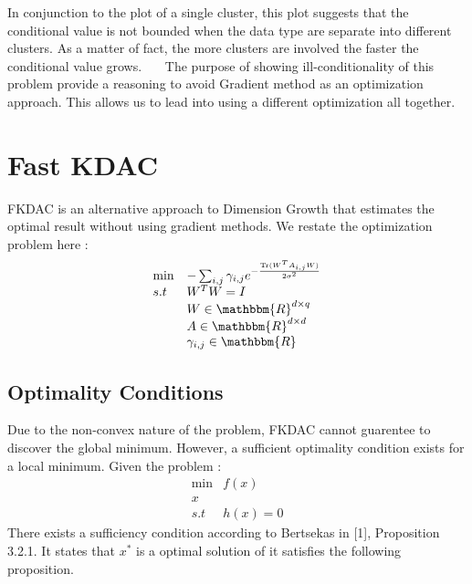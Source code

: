 \documentclass{article}
\newcommand{\tmop}[1]{\ensuremath{\operatorname{#1}}}
\begin{document}
\begin{figure}[h]
  \caption{}
\end{figure}

In conjunction to the plot of a single cluster, this plot suggests that the
conditional value is not bounded when the data type are separate into
different clusters. As a matter of fact, the more clusters are involved the
faster the conditional value grows. \ \ \ The purpose of showing
ill-conditionality of this problem provide a reasoning to avoid Gradient
method as an optimization approach. This allows us to lead into using a
different optimization all together.

\section{Fast KDAC}



FKDAC is an alternative approach to Dimension Growth that estimates the
optimal result without using gradient methods. We restate the optimization
problem here :
\begin{equation}
  \begin{array}{ll}
    \min & - \sum_{i, j} \gamma_{i, j} e^{- \frac{\tmop{Tr} ( W^T A_{i, j}
    W)}{2 \sigma^2}}\\
    s.t & W^T W = I\\
    & W \in \mathbbm{R}^{d \times q}\\
    & A \in \mathbbm{R}^{d \times d}\\
    & \gamma_{i, j} \in \mathbbm{R}
  \end{array}
\end{equation}




\subsection{Optimality Conditions}



Due to the non-convex nature of the problem, FKDAC cannot guarentee to
discover the global minimum. However, a sufficient optimality condition exists
for a local minimum. Given the problem :
\[ \begin{array}{ll}
     \min & f ( x)\\
     x & \\
     s.t & h ( x) = 0
   \end{array} \]
There exists a sufficiency condition according to Bertsekas in [1],
Proposition 3.2.1. It states that $x^{\ast}$ is a optimal solution of it
satisfies the following proposition.
\end{document}
